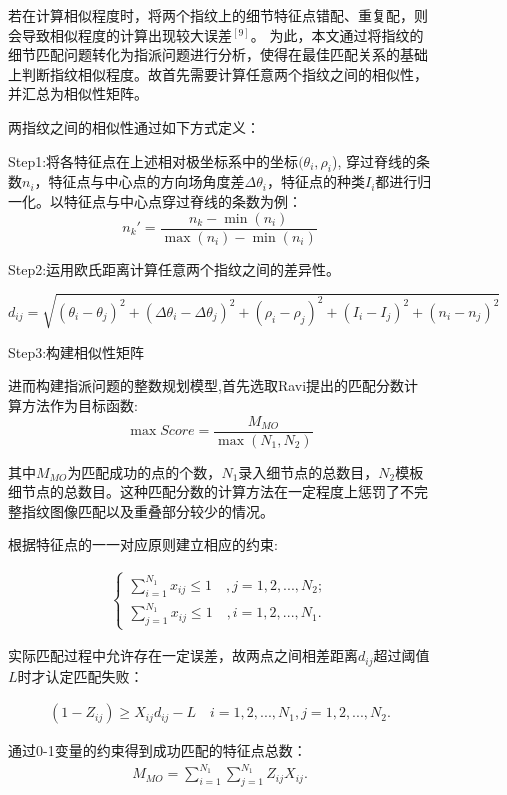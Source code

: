 \documentclass{whutmod}
\begin{document}
\begin{spacing}{1.2}
\begin{figure}[H]
若在计算相似程度时，将两个指纹上的细节特征点错配、重复配，则会导致相似程度的计算出现较大误差$^{[9]}$。
为此，本文通过将指纹的细节匹配问题转化为指派问题进行分析，使得在最佳匹配关系的基础上判断指纹相似程度。故首先需要计算任意两个指纹之间的相似性，并汇总为相似性矩阵。

两指纹之间的相似性通过如下方式定义：

Step1:将各特征点在上述相对极坐标系中的坐标$(\theta_i,\rho_i$),
穿过脊线的条数$n_i$，特征点与中心点的方向场角度差$\Delta\theta_i$，特征点的种类$I_i$都进行归一化。以特征点与中心点穿过脊线的条数为例：
$$ n_k'=\frac{n_k-\min(n_i)}{\max(n_i)-\min(n_i)}$$

Step2:运用欧氏距离计算任意两个指纹之间的差异性。

$$d_{ij}=\sqrt{(\theta_i-\theta_j)^2+(\Delta\theta_i-\Delta\theta_j)^2+(\rho_i-\rho_j)^2+(I_i-I_j)^2+(n_i-n_j)^2}$$

Step3:构建相似性矩阵



进而构建指派问题的整数规划模型,首先选取Ravi提出的匹配分数计算方法作为目标函数:
$$\max Score=\frac{M_{MO}}{\max(N_1,N_2)}$$

其中$M_{MO}$为匹配成功的点的个数，$N_1$录入细节点的总数目，$N_2$模板细节点的总数目。这种匹配分数的计算方法在一定程度上惩罚了不完整指纹图像匹配以及重叠部分较少的情况。

根据特征点的一一对应原则建立相应的约束:

\begin{equation}
	\label{2.6}
	\begin{split}
     \begin{cases}
		 \sum_{i=1}^{N_1}x_{ij}\le1 \quad ,j=1,2,...,N_2;\\
		 \sum_{j=1}^{N_1}x_{ij}\le1 \quad ,i=1,2,...,N_1.
	 \end{cases}
	\end{split}
\end{equation}

实际匹配过程中允许存在一定误差，故两点之间相差距离$d_{ij}$超过阈值$L$时才认定匹配失败：

\begin{equation}
	\label{2.6}
	\begin{split}
	 (1-Z_{ij})\ge X_{ij}d_{ij}-L  \quad i=1,2,...,N_1,j=1,2,...,N_2.
	\end{split}
\end{equation}

通过0-1变量的约束得到成功匹配的特征点总数：
\begin{equation}
	\label{2.7}
	\begin{split}
		M_{MO}=\sum_{i=1}^{N_1}\sum_{j=1}^{N_1}Z_{ij}X_{ij}.
	\end{split}
\end{equation}


\end{figure}
\end{spacing}
\end{document}
